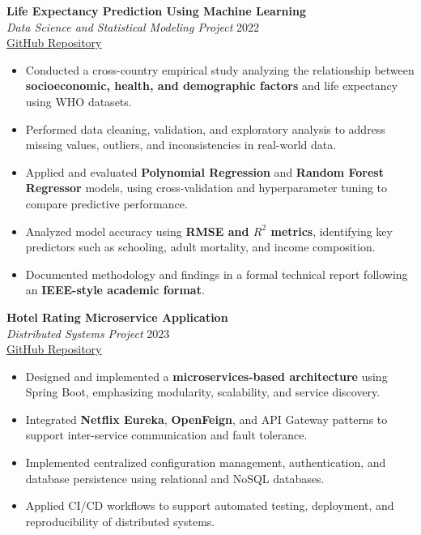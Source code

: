 \documentclass[a4paper,10pt]{article}
\begin{document}
\textbf{Life Expectancy Prediction Using Machine Learning} \\
\textit{Data Science and Statistical Modeling Project} \hfill 2022 \\
\href{https://github.com/prabeshkunwar12/lifeExpectancy}{GitHub Repository}
\begin{itemize}
    \item Conducted a cross-country empirical study analyzing the relationship between \textbf{socioeconomic, health, and demographic factors} and life expectancy using WHO datasets.
    \item Performed data cleaning, validation, and exploratory analysis to address missing values, outliers, and inconsistencies in real-world data.
    \item Applied and evaluated \textbf{Polynomial Regression} and \textbf{Random Forest Regressor} models, using cross-validation and hyperparameter tuning to compare predictive performance.
    \item Analyzed model accuracy using \textbf{RMSE and $R^2$ metrics}, identifying key predictors such as schooling, adult mortality, and income composition.
    \item Documented methodology and findings in a formal technical report following an \textbf{IEEE-style academic format}.
\end{itemize}

\textbf{Hotel Rating Microservice Application} \\
\textit{Distributed Systems Project} \hfill 2023 \\
\href{https://github.com/prabeshkunwar12/micro_yt}{GitHub Repository}
\begin{itemize}
    \item Designed and implemented a \textbf{microservices-based architecture} using Spring Boot, emphasizing modularity, scalability, and service discovery.
    \item Integrated \textbf{Netflix Eureka}, \textbf{OpenFeign}, and API Gateway patterns to support inter-service communication and fault tolerance.
    \item Implemented centralized configuration management, authentication, and database persistence using relational and NoSQL databases.
    \item Applied CI/CD workflows to support automated testing, deployment, and reproducibility of distributed systems.
\end{itemize}


\end{document}
